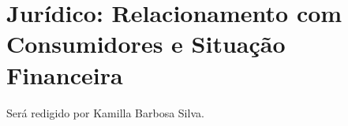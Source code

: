 \section{Jurídico: Relacionamento com Consumidores e Situação Financeira}

Será redigido por Kamilla Barbosa Silva.